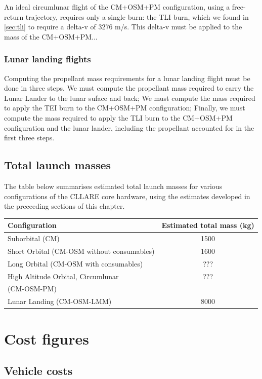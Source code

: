\documentclass{report}
\begin{document}
An ideal circumlunar flight of the CM+OSM+PM configuration, using a free-return trajectory, requires only a single burn: the TLI burn, which we found in \ref{sec:tli} to require a delta-v of 3276 m/s.  This delta-v must be applied to the mass of the CM+OSM+PM...

\subsubsection{Lunar landing flights}

Computing the propellant mass requirements for a lunar landing flight must be done in three steps.  We must compute the propellant mass required to carry the Lunar Lander to the lunar suface and back; We must compute the mass required to apply the TEI burn to the CM+OSM+PM configuration; Finally, we must compute the mass required to apply the TLI burn to the CM+OSM+PM configuration and the lunar lander, including the propellant accounted for in the first three steps.

\subsection{Total launch masses}

The table below summarises estimated total launch masses for various configurations of the CLLARE core hardware, using the estimates developed in the preceeding sections of this chapter.

\begin{tabular}{ | l | c | }
\hline
Configuration & Estimated total mass (kg) \\
\hline
\hline
Suborbital (CM) & 1500 \\
\hline
Short Orbital (CM-OSM without consumables) & 1600 \\
\hline
Long Orbital (CM-OSM with consumables) & ??? \\
\hline
High Altitude Orbital, Circumlunar & ??? \\
(CM-OSM-PM) & \\
\hline
Lunar Landing (CM-OSM-LMM) & 8000 \\
\hline
\end{tabular}

\section{Cost figures}

\subsection{Vehicle costs}
\end{document}
